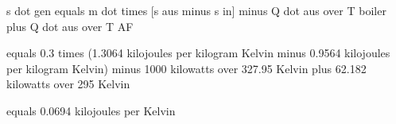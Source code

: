 s dot gen equals m dot times [s aus minus s in] minus Q dot aus over T boiler plus Q dot aus over T AF

equals 0.3 times (1.3064 kilojoules per kilogram Kelvin minus 0.9564 kilojoules per kilogram Kelvin) minus 1000 kilowatts over 327.95 Kelvin plus 62.182 kilowatts over 295 Kelvin

equals 0.0694 kilojoules per Kelvin